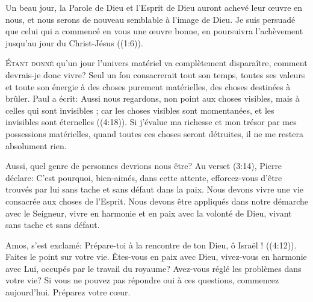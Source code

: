 Un beau jour, la Parole de Dieu et l'Esprit de Dieu auront achevé leur \oe{}uvre
 en nous, et nous serons de nouveau semblable à l'image de Dieu.
 \Og Je suis persuadé que celui qui a commencé en vous une \oe{}uvre bonne,
 en poursuivra l'achèvement jusqu'au jour du Christ-Jésus \Fg{}
 ((1:6)).

\dvrule






\lettrine{É}{tant donné} qu'un jour l'univers matériel va complètement
 disparaître, comment devrais-je donc vivre? Seul un fou consacrerait
 tout son temps, toutes ses valeurs et toute son énergie à des choses purement
 matérielles, des choses destinées à brûler. Paul a écrit: 
 \Og Aussi nous regardons, non point aux choses visibles,
 mais à celles qui sont invisibles ; car les choses visibles sont momentanées,
 et les invisibles sont éternelles \Fg{} ((4:18)).
 Si j'évalue ma richesse et mon trésor par mes possessions matérielles,
 quand toutes ces choses seront détruites, il ne me restera absolument rien.

Aussi, quel genre de personnes devrions nous être? Au verset
 (3:14),
 Pierre déclare: 
 \Og C'est pourquoi, bien-aimés, dans cette attente,
 efforcez-vous d'être trouvés par lui sans tache et sans défaut
 dans la paix. \Fg{}
 Nous devons vivre une vie consacrée aux choses de l'Esprit.
 Nous devons être appliqués dans notre démarche avec le Seigneur,
 vivre en harmonie et en paix avec la volonté de Dieu,
 vivant sans tache et sans défaut.


Amos, s'est exclamé: 
 \Og Prépare-toi à la rencontre de ton Dieu, ô Israël ! \Fg{}
 ((4:12)).
 Faites le point sur votre vie. Êtes-vous en paix avec Dieu,
 vivez-vous en harmonie avec Lui, occupés par le travail du royaume?
 Avez-vous réglé les problèmes dans votre vie? Si vous ne pouvez pas répondre
 \Og oui \Fg{} à ces questions, commencez aujourd'hui. Préparez votre c\oe{}ur.

